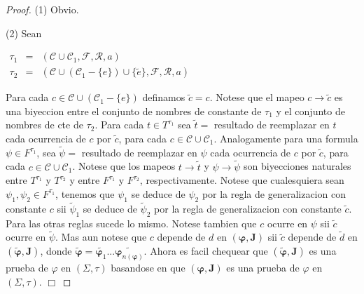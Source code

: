   \begin{proof}
    (1) Obvio.

    (2) Sean

    \(\displaystyle \begin{array}{rcl} \tau _{1} & =& (\mathcal{C}\cup \mathcal{C}_{1},\mathcal{F},\mathcal{R},a) \\ \tau _{2} & =& (\mathcal{C}\cup (\mathcal{C}_{1}-\{e\})\cup \{\tilde{e}\}, \mathcal{F},\mathcal{R},a) \end{array} \)

    Para cada \(c\in \mathcal{C}\cup (\mathcal{C}_{1}-\{e\})\) definamos \(\tilde{c} =c\). Notese que el mapeo \(c\rightarrow \tilde{c}\) es una biyeccion entre el conjunto de nombres de constante de \(\tau _{1}\) y el conjunto de nombres de cte de \(\tau _{2}\). Para cada \(t\in T^{\tau _{1}}\) sea \(\tilde{t}=\) resultado de reemplazar en \(t\) cada ocurrencia de \(c\) por \(\tilde{c}\), para cada \(c\in \mathcal{C}\cup \mathcal{C}_{1}\). Analogamente para una formula \( \psi \in F^{\tau _{1}}\), sea \(\tilde{\psi}=\) resultado de reemplazar en \( \psi \) cada ocurrencia de \(c\) por \(\tilde{c}\), para cada \(c\in \mathcal{C} \cup \mathcal{C}_{1}\). Notese que los mapeos \(t\rightarrow \tilde{t}\) y \( \psi \rightarrow \tilde{\psi}\) son biyecciones naturales entre \(T^{\tau _{1}} \) y \(T^{\tau _{2}}\) y entre \(F^{\tau _{1}}\) y \(F^{\tau _{2}}\), respectivamente. Notese que cualesquiera sean \(\psi _{1},\psi _{2}\in F^{\tau _{1}}\), tenemos que \(\psi _{1}\) se deduce de \(\psi _{2}\) por la regla de generalizacion con constante \(c\) sii \(\tilde{\psi}_{1}\) se deduce de \(\tilde{\psi}_{2}\) por la regla de generalizacion con constante \(\tilde{c} \). Para las otras reglas sucede lo mismo. Notese tambien que \(c\) ocurre en \( \psi \) sii \(\tilde{c}\) ocurre en \(\tilde{\psi}.\) Mas aun notese que \(c\) depende de \(d\) en \((\mathbf{\varphi },\mathbf{J})\) sii \(\tilde{c}\) depende de \(\tilde{d}\) en \((\mathbf{\tilde{\varphi}},\mathbf{J})\), donde \(\mathbf{ \tilde{\varphi}}=\widetilde{\mathbf{\varphi }_{1}}...\widetilde{\mathbf{ \varphi }_{n(\mathbf{\varphi })}}\). Ahora es facil chequear que \((\mathbf{ \tilde{\varphi}},\mathbf{J})\) es una prueba de \(\varphi \) en \((\Sigma ,\tau ) \) basandose en que \((\mathbf{\varphi },\mathbf{J})\) es una prueba de \( \varphi \) en \((\Sigma ,\tau )\). \(\Box\)
  \end{proof}

